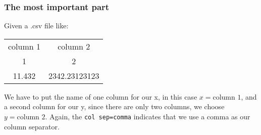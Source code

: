 \documentclass{beamer}
\begin{document}
\begin{frame}
\frametitle{The most important part}

Given a .csv file like:

\begin{table}
\centering
\begin{tabular}{cc}
column 1 & column 2 \\
1 & 2 \\
11.432 & 2342.23123123 \\
\end{tabular}
\end{table}

We have to put the name of one column for our x, in this case $x=\text{{column 1}}$, and a second column for our y, since there are only two columns, we choose $y=\text{{column 2}}$. Again, the \texttt{col sep=comma} indicates that we use a comma as our column separator.

\end{frame}
\end{document}
